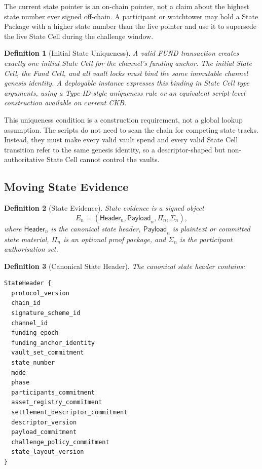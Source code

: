 \documentclass[a4paper,11pt]{article}
\newtheorem{definition}{Definition}
\newcommand{\Header}{\mathsf{Header}}
\newcommand{\Payload}{\mathsf{Payload}}
\begin{document}
The current state pointer is an on-chain pointer, not a claim about the highest
state number ever signed off-chain. A participant or watchtower may hold a
State Package with a higher state number than the live pointer and use it to
supersede the live State Cell during the challenge window.

\begin{definition}[Initial State Uniqueness]
A valid \textsf{FUND} transaction creates exactly one initial State Cell for the channel's funding anchor. The initial State Cell, the Fund Cell, and all vault locks must bind the same immutable channel genesis identity. A deployable instance expresses this binding in State Cell type arguments, using a Type-ID-style uniqueness rule or an equivalent script-level construction available on current CKB.
\end{definition}

This uniqueness condition is a construction requirement, not a global lookup assumption. The scripts do not need to scan the chain for competing state tracks. Instead, they must make every valid vault spend and every valid State Cell transition refer to the same genesis identity, so a descriptor-shaped but non-authoritative State Cell cannot control the vaults.

\subsection{Moving State Evidence}

\begin{definition}[State Evidence]
State evidence is a signed object
\[
E_n=(\Header_n,\Payload_n,\Pi_n,\Sigma_n),
\]
where $\Header_n$ is the canonical state header, $\Payload_n$ is plaintext or committed state material, $\Pi_n$ is an optional proof package, and $\Sigma_n$ is the participant authorisation set.
\end{definition}

\begin{definition}[Canonical State Header]
The canonical state header contains:
\begin{lstlisting}
StateHeader {
  protocol_version
  chain_id
  signature_scheme_id
  channel_id
  funding_epoch
  funding_anchor_identity
  vault_set_commitment
  state_number
  mode
  phase
  participants_commitment
  asset_registry_commitment
  settlement_descriptor_commitment
  descriptor_version
  payload_commitment
  challenge_policy_commitment
  state_layout_version
}
\end{lstlisting}
\end{definition}
\end{document}
